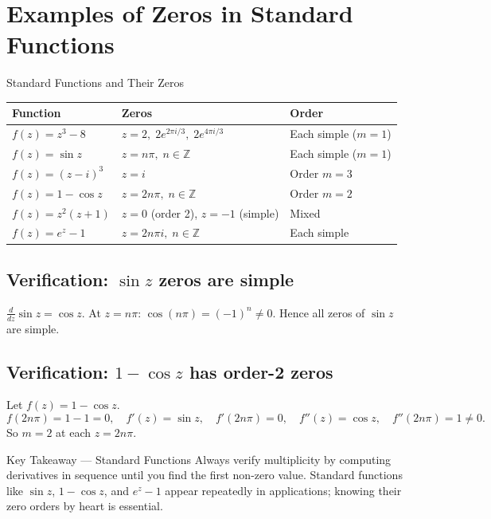 \documentclass[12pt,a4paper]{article}
\begin{document}
\section{Examples of Zeros in Standard Functions}

\begin{infobox}{Standard Functions and Their Zeros}
\begin{center}
\begin{tabular}{>{\raggedright}p{4.2cm} >{\raggedright}p{4.2cm} >{\raggedright\arraybackslash}p{3.8cm}}
\toprule
\textbf{Function} & \textbf{Zeros} & \textbf{Order}\\
\midrule
$f(z)=z^3-8$ & $z=2,\;2e^{2\pi i/3},\;2e^{4\pi i/3}$ & Each simple ($m=1$)\\[4pt]
$f(z)=\sin z$ & $z = n\pi,\; n\in\mathbb{Z}$ & Each simple ($m=1$)\\[4pt]
$f(z)=(z-i)^3$ & $z=i$ & Order $m=3$\\[4pt]
$f(z)=1-\cos z$ & $z=2n\pi,\; n\in\mathbb{Z}$ & Order $m=2$\\[4pt]
$f(z)=z^2(z+1)$ & $z=0$ (order 2), $z=-1$ (simple) & Mixed\\[4pt]
$f(z)=e^z - 1$ & $z=2n\pi i,\; n\in\mathbb{Z}$ & Each simple\\
\bottomrule
\end{tabular}
\end{center}
\end{infobox}

\subsection*{Verification: $\sin z$ zeros are simple}

$\frac{d}{dz}\sin z = \cos z$. At $z = n\pi$: $\cos(n\pi) = (-1)^n \neq 0$. Hence all
zeros of $\sin z$ are simple.

\subsection*{Verification: $1-\cos z$ has order-2 zeros}

Let $f(z) = 1 - \cos z$.
\[
  f(2n\pi) = 1 - 1 = 0,\quad
  f'(z) = \sin z,\quad f'(2n\pi) = 0,\quad
  f''(z) = \cos z,\quad f''(2n\pi) = 1 \neq 0.
\]
So $m = 2$ at each $z = 2n\pi$.

\begin{learnbox}{Key Takeaway --- Standard Functions}
Always verify multiplicity by computing derivatives in sequence until you find the
first non-zero value. Standard functions like $\sin z$, $1-\cos z$, and $e^z-1$ appear
repeatedly in applications; knowing their zero orders by heart is essential.
\end{learnbox}
\end{document}
